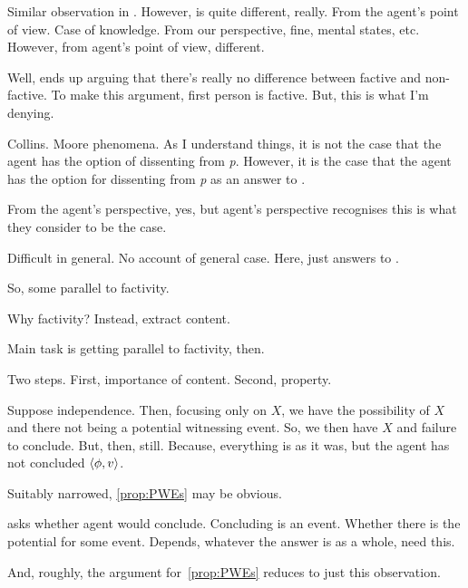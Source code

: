 \begin{note}[Distinction]
  Similar observation in \textcite[132ish]{Dancy:2000aa}.
  However, \citeauthor{Dancy:2000aa} is quite different, really.
  From the agent's point of view.
  Case of knowledge.
  From our perspective, fine, mental states, etc.
  However, from agent's point of view, different.

  Well, \citeauthor{Dancy:2000aa} ends up arguing that there's really no difference between factive and non-factive.
  To make this argument, first person is factive.
  But, this is what I'm denying.

  Collins.
  \textcite[108+]{Dancy:2000aa}
  Moore phenomena.
  As I understand things, it is not the case that the agent has the option of dissenting from \emph{p}.
  However, it is the case that the agent has the option for dissenting from \emph{p} as an answer to \qWhy{}.

  From the agent's perspective, yes, but agent's perspective recognises this is what they consider to be the case.

  Difficult in general.
  No account of general case.
  Here, just answers to \qzS{}.
\end{note}

\begin{note}
  So, some parallel to factivity.

  Why factivity?
  Instead, extract content.

  Main task is getting parallel to factivity, then.
\end{note}

\begin{note}
  \begin{argument}
    Two steps.
    First, importance of content.
    Second, property.

    Suppose independence.
    Then, focusing only on \(X\), we have the possibility of \(X\) and there not being a potential witnessing event.
    So, we then have \(X\) and failure to conclude.
    But, then, \requ{} still.
    Because, everything is as it was, but the agent has not concluded \(\langle \phi, v \rangle\).
  \end{argument}
\end{note}

\begin{note}[Obvious?]
  Suitably narrowed, \autoref{prop:PWEs} may be obvious.

  \qzS{} asks whether agent would conclude.
  Concluding is an event.
  Whether there is the potential for some event.
  Depends, whatever the answer is as a whole, need this.

  And, roughly, the argument for~\autoref{prop:PWEs} reduces to just this observation.
\end{note}


